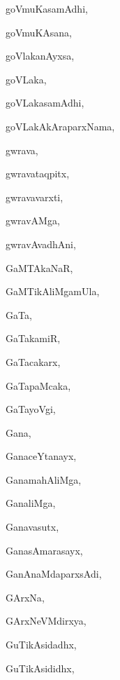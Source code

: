 \begin{multicols}{3}
{\noindent
{goVmuKasamAdhi}, \pageref{goVmuKasamAdhi}

\noindent
{goVmuKAsana}, \pageref{goVmuKAsana}

\noindent
{goVlakanAyxsa}, \pageref{goVlakanAyxsa}

\noindent
{goVLaka}, \pageref{goVLaka}

\noindent
{goVLakasamAdhi}, \pageref{goVLakasamAdhi}

\noindent
{goVLakAkAraparxNama}, \pageref{goVLakAkAraparxNama}

\noindent
{gwrava}, \pageref{gwrava}

\noindent
{gwravataqpitx}, \pageref{gwravataqpitx}

\noindent
{gwravavarxti}, \pageref{gwravavarxti}

\noindent
{gwravAMga}, \pageref{gwravAMga}

\noindent
{gwravAvadhAni}, \pageref{gwravAvadhAni}

\bigskip
\noindent
{}
\smallskip

\noindent
{GaMTAkaNaR}, \pageref{GaMTAkaNaR}

\noindent
{GaMTikAliMgamUla}, \pageref{GaMTikAliMgamUla}

\noindent
{GaTa}, \pageref{GaTa}

\noindent
{GaTakamiR}, \pageref{GaTakamiR}

\noindent
{GaTacakarx}, \pageref{GaTacakarx}

\noindent
{GaTapaMcaka}, \pageref{GaTapaMcaka}

\noindent
{GaTayoVgi}, \pageref{GaTayoVgi}

\noindent
{Gana}, \pageref{Gana}

\noindent
{GanaceYtanayx}, \pageref{GanaceYtanayx}

\noindent
{GanamahAliMga}, \pageref{GanamahAliMga}

\noindent
{GanaliMga}, \pageref{GanaliMga}

\noindent
{Ganavasutx}, \pageref{Ganavasutx}

\noindent
{GanasAmarasayx}, \pageref{GanasAmarasayx}

\noindent
{GanAnaMdaparxsAdi}, \pageref{GanAnaMdaparxsAdi}

\noindent
{GArxNa}, \pageref{GArxNa}

\noindent
{GArxNeVMdirxya}, \pageref{GArxNeVMdirxya}

\noindent
{GuTikAsidadhx}, \pageref{GuTikAsidadhx}

\noindent
{GuTikAsididhx}, \pageref{GuTikAsididhx}

}
\end{multicols}
